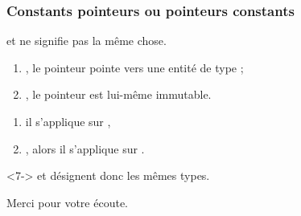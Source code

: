 \documentclass{cppcourses}
\begin{document}
\begin{frame}

\frametitle{Constants pointeurs ou pointeurs constants}

 et  ne signifie pas la même chose.

\begin{enumerate}
    \item<2-> , le pointeur pointe vers une entité de type  ;
    \item<3-> , le pointeur est lui-même immutable.
\end{enumerate}


\begin{enumerate}
    \item<5-> il s'applique sur ,
    \item<6-> , alors il s'applique sur .
\end{enumerate}

\begin{remark}<7->
 et  désignent donc les mêmes types.
\end{remark}

\end{frame}

\begin{frame}

\centering\Large

Merci pour votre écoute.

\end{frame}
\end{document}

